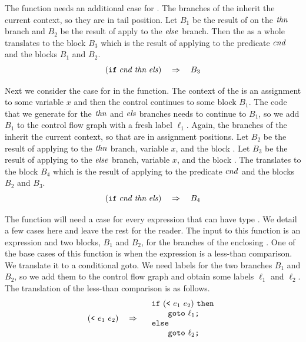 \documentclass[11pt]{book}
\begin{document}
The  function needs an additional case for
. The branches of the  inherit the current context, so
they are in tail position.  Let $B_1$ be the result of
 on the $\mathit{thn}$ branch and $B_2$ be the
result of apply  to the $\mathit{else}$ branch. Then
the  as a whole translates to the block $B_3$ which is the
result of applying  to the predicate $\mathit{cnd}$
and the blocks $B_1$ and $B_2$.
\[
    (\texttt{if}\; \mathit{cnd}\; \mathit{thn}\; \mathit{els}) \quad\Rightarrow\quad B_3
\]

Next we consider the case for  in the
 function. The context of the
 is an assignment to some variable $x$ and then the control
continues to some block $B_1$.  The code that we generate for the
$\mathit{thn}$ and $\mathit{els}$ branches needs to continue to
$B_1$, so we add $B_1$ to the control flow graph with a fresh label
$\ell_1$.  Again, the branches of the  inherit the current
context, so that are in assignment positions.  Let $B_2$ be the result
of applying  to the $\mathit{thn}$ branch,
variable $x$, and the block .  Let $B_3$ be the
result of applying  to the $\mathit{else}$
branch, variable $x$, and the block . The
 translates to the block $B_4$ which is the result of applying
 to the predicate $\mathit{cnd}$ and the
blocks $B_2$ and $B_3$.
\[
(\texttt{if}\; \mathit{cnd}\; \mathit{thn}\; \mathit{els}) \quad\Rightarrow\quad B_4
\]

The function  will need a case for every
expression that can have type . We detail a few cases
here and leave the rest for the reader. The input to this function is
an expression and two blocks, $B_1$ and $B_2$, for the branches of the
enclosing . One of the base cases of this function is when the
expression is a less-than comparison. We translate it to a conditional
goto. We need labels for the two branches $B_1$ and $B_2$, so we add
them to the control flow graph and obtain some labels $\ell_1$ and
$\ell_2$. The translation of the less-than comparison is as follows.
\[
(\texttt{<}~e_1~e_2) \quad\Rightarrow\quad
\begin{array}{l}
\texttt{if}~(\texttt{<}~e_1~e_2)~\texttt{then} \\
\qquad\texttt{goto}~\ell_1\texttt{;}\\
\texttt{else}\\
\qquad\texttt{goto}~\ell_2\texttt{;}
\end{array}
\]
\end{document}

